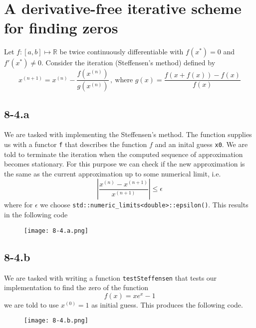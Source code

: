 \documentclass{article}
\newcommand\xn{x^{\left(n\right)}}
\newcommand\xkn{x^{\left(n+1\right)}}
\newcommand\xz{x^{\left(0\right)}}
\newcommand\xstar{x^{*}}
\begin{document}
\section*{A derivative-free iterative scheme for finding zeros}
Let $f : \left[a,b\right] \mapsto \mathbb{R}$ be twice continuously differentiable with $f\left(\xstar\right) = 0$ and $f'\left(\xstar\right) \neq 0$. Consider the iteration (Steffensen's method) defined by
\begin{equation*}
    \xkn = \xn - \frac{f\left(\xn\right)}{g\left(\xn\right)} \,, \: \text{where } g\left(x\right) = \frac{f\left(x + f\left(x\right)\right) - f\left(x\right)}{f\left(x\right)}
\end{equation*}
\subsection*{8-4.a}
We are tasked with implementing the Steffensen's method. The function supplies us with a functor \verb|f| that describes the function $f$ and an inital guess \verb|x0|. We are told to terminate the iteration when the computed sequence of approximation becomes stationary. For this purpose we can check if the new approximation is the same as the current approximation up to some numerical limit, i.e.
\begin{equation*}
   \left\lvert \frac{\xn - \xkn}{\xkn}\right\rvert \leq \epsilon
\end{equation*}
where for $\epsilon$ we choose \verb|std::numeric_limits<double>::epsilon()|. This results in the following code

\begin{figure}[!hbt]
    \centering
\texttt{[image: 8-4.a.png]}
\end{figure}

\pagebreak

\subsection*{8-4.b}
We are tasked with writing a function \verb|testSteffensen| that tests our implementation to find the zero of the function
\begin{equation*}
    f\left(x\right) = xe^{x} - 1
\end{equation*}
we are told to use $\xz = 1$ as initial guess. This produces the following code.

\begin{figure}[!hbt]
    \centering
\texttt{[image: 8-4.b.png]}
\end{figure}
\end{document}
